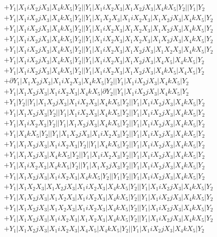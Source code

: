 \documentclass{article}[12pt]
\begin{document}
\begin{align*}
 & +Y_1|X_1iX_2jX_3|X_4kX_5|Y_2||Y_1|X_1iX_2X_3|X_1X_2jX_3|X_4kX_5|Y_2||Y_1|Y_2\\ 
 & +Y_1|X_1iX_2jX_3|X_4kX_5|Y_2||Y_1|X_1X_2X_3|X_1iX_2X_3|X_1X_2jX_3|X_4kX_5|Y_2\\ 
 & +Y_1|X_1iX_2jX_3|X_4kX_5|Y_2||Y_1|X_1iX_2X_3|X_1X_2X_3|X_1X_2jX_3|X_4kX_5|Y_2\\ 
 & +Y_1|X_1iX_2jX_3|X_4kX_5|Y_2||Y_1|X_1iX_2X_3|X_1X_2X_3|X_1X_2jX_3|X_4kX_5|Y_2\\ 
 & +Y_1|X_1iX_2jX_3|X_4kX_5|Y_2||Y_1|X_1iX_2X_3|X_1X_2jX_3|X_1X_2X_3|X_4kX_5|Y_2\\ 
 & +Y_1|X_1iX_2jX_3|X_4kX_5|Y_2||Y_1|X_1iX_2X_3|X_1X_2jX_3|X_4X_5|X_4kX_5|Y_2\\ 
 & +Y_1|X_1iX_2jX_3|X_4kX_5|Y_2||Y_1|X_1iX_2X_3|X_1X_2jX_3|X_4kX_5|X_4X_5|Y_2\\ 
 & +\partial Y_1|X_1X_2jX_3|X_1iX_2X_3|X_4kX_5|Y_2||Y_1|X_1iX_2jX_3|X_4kX_5|Y_2\\ 
 & +Y_1|X_1X_2jX_3|X_1iX_2X_3|X_4kX_5|\partial Y_2||Y_1|X_1iX_2jX_3|X_4kX_5|Y_2\\ 
 & +Y_1|Y_2||Y_1|X_1X_2jX_3|X_1iX_2X_3|X_4kX_5|Y_2||Y_1|X_1iX_2jX_3|X_4kX_5|Y_2\\ 
 & +Y_1|X_1X_2jX_3|Y_2||Y_1|X_1iX_2X_3|X_4kX_5|Y_2||Y_1|X_1iX_2jX_3|X_4kX_5|Y_2\\ 
 & +Y_1|X_1iX_2X_3|Y_2||Y_1|X_1X_2jX_3|X_4kX_5|Y_2||Y_1|X_1iX_2jX_3|X_4kX_5|Y_2\\ 
 & +Y_1|X_4kX_5|Y_2||Y_1|X_1X_2jX_3|X_1iX_2X_3|Y_2||Y_1|X_1iX_2jX_3|X_4kX_5|Y_2\\ 
 & +Y_1|X_1X_2jX_3|X_1iX_2X_3|Y_2||Y_1|X_4kX_5|Y_2||Y_1|X_1iX_2jX_3|X_4kX_5|Y_2\\ 
 & +Y_1|X_1X_2jX_3|X_4kX_5|Y_2||Y_1|X_1iX_2X_3|Y_2||Y_1|X_1iX_2jX_3|X_4kX_5|Y_2\\ 
 & +Y_1|X_1iX_2X_3|X_4kX_5|Y_2||Y_1|X_1X_2jX_3|Y_2||Y_1|X_1iX_2jX_3|X_4kX_5|Y_2\\ 
 & +Y_1|X_1X_2jX_3|X_1iX_2X_3|X_4kX_5|Y_2||Y_1|Y_2||Y_1|X_1iX_2jX_3|X_4kX_5|Y_2\\ 
 & +Y_1|X_1X_2X_3|X_1X_2jX_3|X_1iX_2X_3|X_4kX_5|Y_2||Y_1|X_1iX_2jX_3|X_4kX_5|Y_2\\ 
 & +Y_1|X_1X_2jX_3|X_1X_2X_3|X_1iX_2X_3|X_4kX_5|Y_2||Y_1|X_1iX_2jX_3|X_4kX_5|Y_2\\ 
 & +Y_1|X_1X_2jX_3|X_1X_2X_3|X_1iX_2X_3|X_4kX_5|Y_2||Y_1|X_1iX_2jX_3|X_4kX_5|Y_2\\ 
 & +Y_1|X_1X_2jX_3|X_1iX_2X_3|X_1X_2X_3|X_4kX_5|Y_2||Y_1|X_1iX_2jX_3|X_4kX_5|Y_2\\ 
 & +Y_1|X_1X_2jX_3|X_1iX_2X_3|X_4X_5|X_4kX_5|Y_2||Y_1|X_1iX_2jX_3|X_4kX_5|Y_2\\ 

\end{align*}
\end{document}
